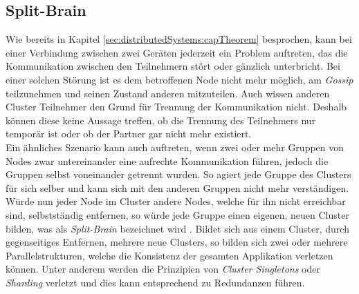 \subsection{Split-Brain} 
\label{subsec:implementation:splitBrain}
Wie bereits in Kapitel \ref{sec:distributedSystems:capTheorem} besprochen, kann bei einer Verbindung zwischen zwei Geräten jederzeit ein Problem auftreten, das die Kommunikation zwischen den Teilnehmern stört oder gänzlich unterbricht. Bei einer solchen Störung ist es dem betroffenen Node nicht mehr möglich, am \textit{Gossip} teilzunehmen und seinen Zustand anderen mitzuteilen. Auch wissen anderen Cluster Teilnehmer den Grund für Trennung der Kommunikation nicht. Deshalb können diese keine Aussage treffen, ob die Trennung des Teilnehmers nur temporär ist oder ob der Partner gar nicht mehr existiert. \\
Ein ähnliches Szenario kann auch auftreten, wenn zwei oder mehr Gruppen von Nodes zwar untereinander eine aufrechte Kommunikation führen, jedoch die Gruppen selbst voneinander getrennt wurden. So agiert jede Gruppe des Clusters für sich selber und kann sich  mit den anderen Gruppen nicht mehr verständigen. Würde nun jeder Node im Cluster andere Nodes, welche für ihn nicht erreichbar sind, selbstständig entfernen, so würde jede Gruppe einen eigenen, neuen Cluster bilden, was als \textit{Split-Brain} bezeichnet wird \citep{networkIsReliable}. Bildet sich aus einem Cluster, durch gegenseitiges Entfernen, mehrere neue Clusters, so bilden sich zwei oder mehrere Parallelstrukturen, welche die Konsistenz der gesamten Applikation verletzen können. Unter anderem werden die Prinzipien von \textit{Cluster Singletons} oder \textit{Sharding} verletzt und dies kann entsprechend zu Redundanzen führen. \\
% 
% 
% 

